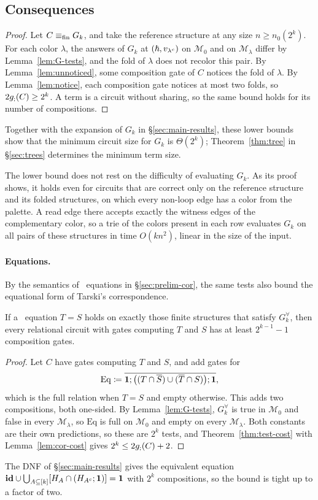 \subsection{Consequences}\label{sec:query-bounds}
\mainbounds*
\begin{proof}
Let $C\equiv_{\mathrm{fin}} G_k$, and take the reference structure at
any size $n\ge n_0(2^k)$. For each color $\lambda$, the answers of $G_k$
at $(\hslash,v_{\lambda^c})$ on $\mathcal M_0$ and on $\mathcal M_\lambda$ differ
by Lemma~\ref{lem:G-tests}, and the fold of $\lambda$ does not recolor
this pair. By Lemma~\ref{lem:unnoticed}, some composition gate of $C$
notices the fold of $\lambda$. By Lemma~\ref{lem:notice}, each
composition gate notices at most two folds, so $2g_{;}(C)\ge2^k$. A term
is a circuit without sharing, so the same bound holds for its number of
compositions.
\end{proof}
Together with the expansion of $G_k$ in \S\ref{sec:main-results}, these
lower bounds show that the minimum circuit size for $G_k$ is
$\Theta(2^k)$; Theorem~\ref{thm:tree} in \S\ref{sec:trees}
determines the minimum term size.

The lower bound does not rest on the difficulty of evaluating $G_k$. As
its proof shows, it holds even for circuits that are correct only on the
reference structure and its folded structures, on which every non-loop
edge has a color from the palette. A read edge there accepts exactly the
witness edges of the complementary color, so a trie of the colors
present in each row evaluates $G_k$ on all pairs of these structures in
time $O(kn^2)$, linear in the size of the input.

\paragraph{Equations.}
By the semantics of \CoR\ equations in \S\ref{sec:prelim-cor},
the same tests also bound the equational form of Tarski's correspondence.
\begin{corollary}\label{cor:equations}
If a \CoR\ equation $T=S$ holds on exactly those finite structures that
satisfy $G_k^\forall$, then every relational circuit with gates computing
$T$ and $S$ has at least $2^{k-1}-1$ composition gates.
\end{corollary}
\begin{proof}
Let $C$ have gates computing $T$ and $S$, and add gates for
\[
 \mathrm{Eq}\coloneqq\overline{\mathbf{1};\bigl((T\cap\overline S)\cup(\overline T\cap S)\bigr);\mathbf{1}},
\]
which is the full relation when $T=S$ and empty otherwise. This adds two
compositions, both one-sided. By Lemma~\ref{lem:G-tests}, $G_k^\forall$
is true in $\mathcal M_0$ and false in every $\mathcal M_\lambda$, so
$\mathrm{Eq}$ is full on $\mathcal M_0$ and empty on every
$\mathcal M_\lambda$. Both constants are their own predictions, so these
are $2^k$ tests, and Theorem~\ref{thm:test-cost} with
Lemma~\ref{lem:cor-cost} gives $2^k\le2g_{;}(C)+2$.
\end{proof}
The DNF of \S\ref{sec:main-results} gives the equivalent equation
$\mathbf{id}\cup\bigcup_{A\subseteq[k]}[H_A\cap(H_{A^c};\mathbf{1})]=\mathbf{1}$
with $2^k$ compositions, so the bound is tight up to a factor of two.

